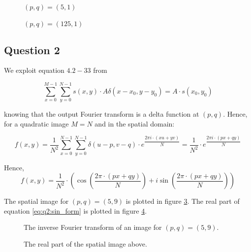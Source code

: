 	  	\begin{figure}[H]
			\centering
			\scalebox{0.7}{}
			\caption{$(p,q)=(5,1)$}
			\label{fig:51}
	  	\end{figure}
	  	
	  	\begin{figure}[H]
			\centering
			\scalebox{0.7}{}
			\caption{$(p,q)=(125,1)$}
			\label{fig:1251}
	  	\end{figure}
	  	
	  	
  	\subsection{Question 2}
  
  		We exploit equation $4.2-33$ from \cite{GZ}  
  
  		\begin{equation}
  			\sum_{x=0}^{M-1}\sum_{y=0}^{N-1} s(x,y) \cdot A \delta(x-x_0, y-y_0) = A \cdot s(x_0, y_0)
  		\end{equation}
  
  		knowing that the output Fourier transform is a delta function at $(p,q)$. Hence, for a quadratic image $M=N$ and in the spatial domain:
  
  		\begin{equation}
  			f(x,y)= \frac{1}{N^2} \sum_{x=0}^{N-1}\sum_{y=0}^{N-1} \delta(u - p, v - q) \cdot e^{\dfrac{2 \pi i \cdot (xu + yv)}{N}} = 
  			\frac{1}{N^2} \cdot e^{\dfrac{2 \pi i \cdot (px + qy)}{N}}
  		\end{equation}
  
	  	Hence, 
	  	\begin{equation}
	  		f(x,y) = \frac{1}{N^2} \cdot (\cos(\dfrac{2 \pi \cdot (px + qy)}{N}) + i\sin(\dfrac{2 \pi \cdot (px + qy)}{N}))
	  		\label{eq:q2:sin_form}
	  	\end{equation}
	  	
	  	The spatial image for $(p,q)=(5,9)$ is plotted in figure \ref{fig:q2_1}.
	  	The real part of equation \ref{eq:q2:sin_form} is plotted in figure \ref{fig:q2_2}.
  
  	  	\begin{figure}[H]
			\centering
			\scalebox{.6}{}
			\caption{The inverse Fourier transform of an image for $(p,q)=(5,9)$.}
			\label{fig:q2_1}
	  	\end{figure}
  
	  	\begin{figure}[H]
			\centering
			\scalebox{.6}{}
			\caption{The real part of the spatial image above.}
			\label{fig:q2_2}
	  	\end{figure}



